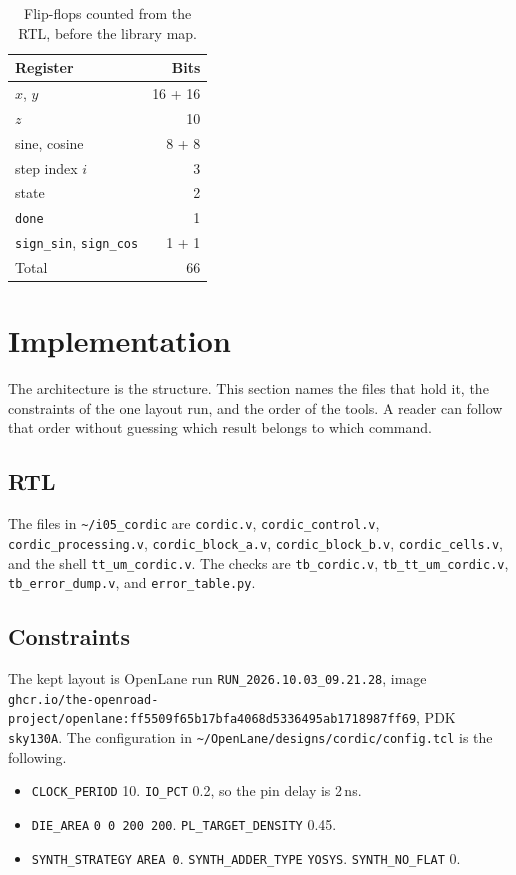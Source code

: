 \documentclass[11pt,a4paper]{article}
\begin{document}
\begin{table}[ht]
\centering
\caption{Flip-flops counted from the RTL, before the library map.}
\label{tab:ff}
\begin{tabular}{lr}
\toprule
Register & Bits \\
\midrule
\(x\), \(y\) & 16 + 16 \\
\(z\) & 10 \\
sine, cosine & 8 + 8 \\
step index \(i\) & 3 \\
state & 2 \\
\texttt{done} & 1 \\
\texttt{sign\_sin}, \texttt{sign\_cos} & 1 + 1 \\
\midrule
Total & 66 \\
\bottomrule
\end{tabular}
\end{table}

\section{Implementation}

The architecture is the structure. This section names the files that hold it, the constraints of the one layout run, and the order of the tools. A reader can follow that order without guessing which result belongs to which command.

\subsection{RTL}
The files in \texttt{\textasciitilde/i05\_cordic} are \texttt{cordic.v}, \texttt{cordic\_control.v}, \texttt{cordic\_processing.v}, \texttt{cordic\_block\_a.v}, \texttt{cordic\_block\_b.v}, \texttt{cordic\_cells.v}, and the shell \texttt{tt\_um\_cordic.v}. The checks are \texttt{tb\_cordic.v}, \texttt{tb\_tt\_um\_cordic.v}, \texttt{tb\_error\_dump.v}, and \texttt{error\_table.py}.

\subsection{Constraints}
The kept layout is OpenLane run \texttt{RUN\_2026.10.03\_09.21.28}, image \texttt{ghcr.io/the-openroad-project/openlane:ff5509f65b17bfa4068d5336495ab1718987ff69}, PDK \texttt{sky130A}. The configuration in \texttt{\textasciitilde/OpenLane/designs/cordic/config.tcl} is the following.

\begin{itemize}
  \item \texttt{CLOCK\_PERIOD} 10. \texttt{IO\_PCT} 0.2, so the pin delay is 2\,ns.
  \item \texttt{DIE\_AREA} \texttt{0 0 200 200}. \texttt{PL\_TARGET\_DENSITY} 0.45.
  \item \texttt{SYNTH\_STRATEGY} \texttt{AREA 0}. \texttt{SYNTH\_ADDER\_TYPE} \texttt{YOSYS}. \texttt{SYNTH\_NO\_FLAT} 0.
\end{itemize}
\end{document}
